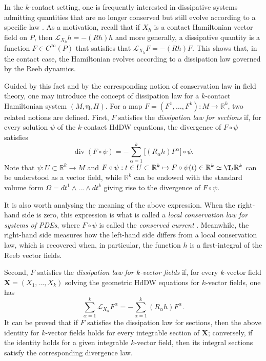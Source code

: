 \documentclass[11pt,a4paper]{article}
\theoremstyle{plain} \newtheorem{theorem}{Theorem}[section] \newtheorem{proposition}[theorem]{Proposition} \newtheorem{corollary}[theorem]{Corollary} \newtheorem{lemma}[theorem]{Lemma} \theoremstyle{definition} \newtheorem{definition}[theorem]{Definition} \theoremstyle{remark} \newtheorem{remark}[theorem]{Remark} \newtheorem{example}[theorem]{Example} %
\begin{document}
In the $k$-contact setting, one is frequently interested in dissipative systems admitting quantities that are no longer conserved but still evolve according to a specific law \cite{CCM_18}. As a motivation, recall that if $X_h$ is a contact Hamiltonian vector field on $P$, then $\mathcal{L}_{X_h}h=-(Rh)h$ and more generally, a dissipative quantity is a function $F\in C^\infty(P)$ that satisfies that $\mathcal{L}_{X_h}F=-(Rh)F$. This shows that, in the contact case, the Hamiltonian evolves according to a  dissipation law governed by the Reeb dynamics.

Guided by this fact and by the corresponding notion of conservation law in field theory, one may introduce the concept of dissipation law for a $k$-contact Hamiltonian system $(M,\bm \eta ,H)$. For a map $F=(F^1,\dots,F^k)\colon M\to\mathbb{R}^k$, two related notions are defined. First, $F$ satisfies the \emph{dissipation law for sections} if, for every solution $\psi$ of the $k$-contact HdDW equations, the divergence of $F\circ\psi$ satisfies
\[
\operatorname{div}(F\circ\psi)=-\sum_{\alpha=1}^k\bigl[(R_\alpha h)F^\alpha\bigr]\circ\psi.
\]
Note that $\psi:U\subset \mathbb{R}^k\rightarrow M$ and $F\circ\psi:t\in U\subset \mathbb{R}^k\mapsto F\circ\psi(t)\in \mathbb{R}^k\simeq \T_t\mathbb{R}^k$ can be understood as a vector field, while $\mathbb{R}^k$ can be endowed with the standard volume form $\Omega=dt^1\wedge\ldots\wedge dt^k$ giving rise to the divergence of $F\circ \psi$. 

It is also worth analysing the meaning of the above expression. When the right-hand side is zero, this expression is what is called a {\it local conservation law for systems of PDEs}, where $F\circ \psi$ is called the {\it conserved current} \cite{OLV_86,Gun_87,OP2020}. Meanwhile, the right-hand side  measures how the left-hand side differs from a local conservation law, which is recovered when, in particular, the function $h$ is a first-integral of the Reeb vector fields.

Second, $F$ satisfies the \emph{dissipation law for $k$-vector fields} if, for every $k$-vector field $\mathbf{X}=(X_1,\ldots,X_k)$ solving the geometric HdDW equations for $k$-vector fields, one has
\[
\sum_{\alpha=1}^k\mathcal{L}_{X_\alpha}F^\alpha=-\sum_{\alpha=1}^k(R_\alpha h)F^\alpha.
\]
It can be proved that  if $F$ satisfies the dissipation law for sections, then the above identity for $k$-vector fields holds for every integrable section of $\mathbf{X}$; conversely, if the identity holds for a given integrable $k$-vector field, then its integral sections satisfy the corresponding divergence law.  
\end{document}
